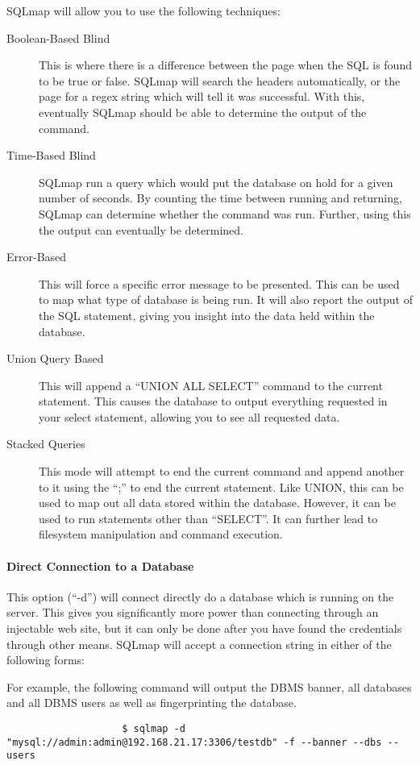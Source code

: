 			SQLmap will allow you to use the following techniques:
			\begin{description}
				\item[Boolean-Based Blind] This is where there is a difference between the page when the SQL is found to be true or false.
					SQLmap will search the headers automatically, or the page for a regex string which will tell it was successful.
					With this, eventually SQLmap should be able to determine the output of the command.
				\item[Time-Based Blind] SQLmap run a query which would put the database on hold for a given number of seconds.
					By counting the time between running and returning, SQLmap can determine whether the command was run.
					Further, using this the output can eventually be determined.
				\item[Error-Based] This will force a specific error message to be presented.
					This can be used to map what type of database is being run.
					It will also report the output of the SQL statement, giving you insight into the data held within the database.
				\item[Union Query Based] This will append a ``UNION ALL SELECT'' command to the current statement.
					This causes the database to output everything requested in your select statement, allowing you to see all requested data.
				\item[Stacked Queries] This mode will attempt to end the current command and append another to it using the ``;'' to end the current statement.
					Like UNION, this can be used to map out all data stored within the database.
					However, it can be used to run statements other than ``SELECT''.
					It can further lead to filesystem manipulation and command execution.
			\end{description}
			\paragraph{Direct Connection to a Database}
				This option (``-d'') will connect directly do a database which is running on the server.
				This gives you significantly more power than connecting through an injectable web site, but it can only be done after you have found the credentials through other means.
				SQLmap will accept a connection string in either of the following forms:
				
				For example, the following command will output the DBMS banner, all databases and all DBMS users as well as fingerprinting the database.
				\begin{verbatim}
					$ sqlmap -d "mysql://admin:admin@192.168.21.17:3306/testdb" -f --banner --dbs --users
				\end{verbatim}

